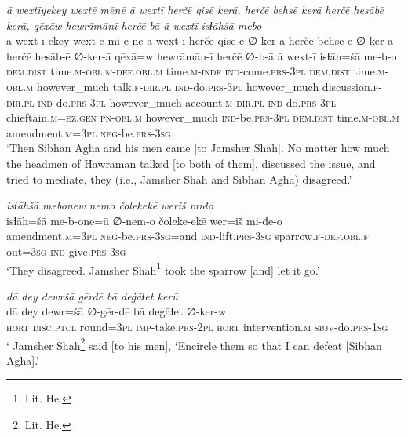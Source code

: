\ea \label{DP.46}
\textit{ā wextīyekey wextē mēnē ā wextī herčē qisē kerā, herčē behsē kerā herčē hesābē kerā, qēxāw hewrāmānī herčē bā ā wextī isɫāhšā mebo} \\ 
\gll ā wext-ī-ekey wext-ē mi-ē-nē ā wext-ī herčē qisē-ē ∅-ker-ā herčē behse-ē ∅-ker-ā herčē hesāb-ē ∅-ker-ā qēxā=w hewrāmān-ī herčē ∅-b-ā ā wext-ī isɫāh=šā me-b-o \\ 
 \textsc{dem.dist} time\textsc{.m}\textsc{-obl}\textsc{.m}\textsc{-def}\textsc{.obl}\textsc{.m} time\textsc{.m}\textsc{-indf} \textsc{ind-}come\textsc{.prs}\textsc{-3pl} \textsc{dem.dist} time\textsc{.m}\textsc{-obl}\textsc{.m} however\_much talk\textsc{\textsc{.f}}\textsc{-dir}\textsc{.pl} \textsc{ind-}do\textsc{.prs}\textsc{-3pl} however\_much discussion\textsc{\textsc{.f}}\textsc{-dir}\textsc{.pl} \textsc{ind-}do\textsc{.prs}\textsc{-3pl} however\_much account\textsc{.m}\textsc{-dir}\textsc{.pl} \textsc{ind-}do\textsc{.prs}\textsc{-3pl} chieftain\textsc{.m}\textsc{=ez}\textsc{.gen} \textsc{pn}\textsc{-obl}\textsc{.m} however\_much \textsc{ind-}be\textsc{.prs}\textsc{-3pl} \textsc{dem.dist} time\textsc{.m}\textsc{-obl}\textsc{.m} amendment\textsc{.m}\textsc{=3pl} \textsc{neg-}be\textsc{.prs}\textsc{-3sg} \\ 
\glt `Then Sibhan Agha and his men came [to Jamsher Shah]. No matter how much the headmen of Hawraman talked [to both of them], discussed the issue, and tried to mediate, they (i.e., Jamsher Shah and Sibhan Agha) disagreed.'
\z 
 
\ea \label{DP.47}
\textit{isɫāhšā mebonew nemo čolekekē weriš miđo} \\ 
\gll isɫāh=šā me-b-one=ū ∅-nem-o čoleke-ekē wer=iš mi-đe-o \\ 
 amendment\textsc{.m}\textsc{=3pl} \textsc{neg-}be\textsc{.prs}\textsc{-3sg}=and \textsc{ind-}lift\textsc{.prs}\textsc{-3sg} sparrow\textsc{\textsc{.f}}\textsc{-def}\textsc{.obl}\textsc{\textsc{.f}} out\textsc{=3sg} \textsc{ind-}give\textsc{.prs}\textsc{-3sg} \\ 
\glt `They disagreed. Jamsher Shah\footnote{Lit. He.} took the sparrow [and] let it go.'
\z 
 
\ea \label{DP.51}
\textit{dā dey dewršā gērdē bā deġāɫet kerū} \\ 
\gll dā dey dewr=šā ∅-gēr-dē bā deġāɫet ∅-ker-w \\ 
 \textsc{hort} \textsc{disc.ptcl} round\textsc{=3pl} \textsc{imp-}take\textsc{.prs}\textsc{-2pl} \textsc{hort} intervention\textsc{.m} \textsc{sbjv-}do\textsc{.prs}\textsc{-1sg} \\ 
\glt ` Jamsher Shah\footnote{Lit. He.} said [to his men], ‘Encircle them so that I can defeat [Sibhan Agha].'
\z 
 
